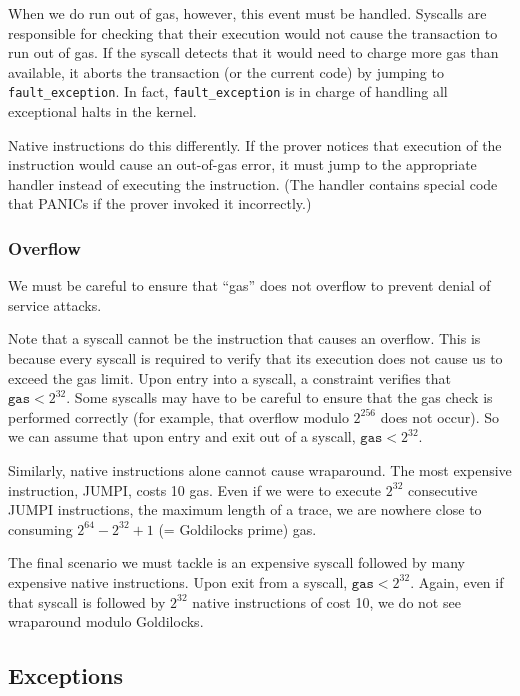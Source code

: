 When we do run out of gas, however, this event must be handled. Syscalls are responsible for checking that their execution would not cause the transaction to run out of gas. If the syscall detects that it would need to charge more gas than available, it aborts the transaction (or the current code) by jumping to \texttt{fault\_exception}. In fact, \texttt{fault\_exception} is in charge of handling all exceptional halts in the kernel.

Native instructions do this differently. If the prover notices that execution of the instruction would cause an out-of-gas error, it must jump to the appropriate handler instead of executing the instruction. (The handler contains special code that PANICs if the prover invoked it incorrectly.)

\subsubsection{Overflow}

We must be careful to ensure that ``gas'' does not overflow to prevent denial of service attacks.

Note that a syscall cannot be the instruction that causes an overflow. This is because every syscall is required to verify that its execution does not cause us to exceed the gas limit. Upon entry into a syscall, a constraint verifies that $\texttt{gas} < 2^{32}$. Some syscalls may have to be careful to ensure that the gas check is performed correctly (for example, that overflow modulo $2^{256}$ does not occur). So we can assume that upon entry and exit out of a syscall, $\texttt{gas} < 2^{32}$.

Similarly, native instructions alone cannot cause wraparound. The most expensive instruction, JUMPI, costs 10 gas. Even if we were to execute $2^{32}$ consecutive JUMPI instructions, the maximum length of a trace, we are nowhere close to consuming $2^{64} - 2^{32} + 1$ (= Goldilocks prime) gas.

The final scenario we must tackle is an expensive syscall followed by many expensive native instructions. Upon exit from a syscall, $\texttt{gas} < 2^{32}$. Again, even if that syscall is followed by $2^{32}$ native instructions of cost 10, we do not see wraparound modulo Goldilocks.


\subsection{Exceptions}
\label{exceptions}

